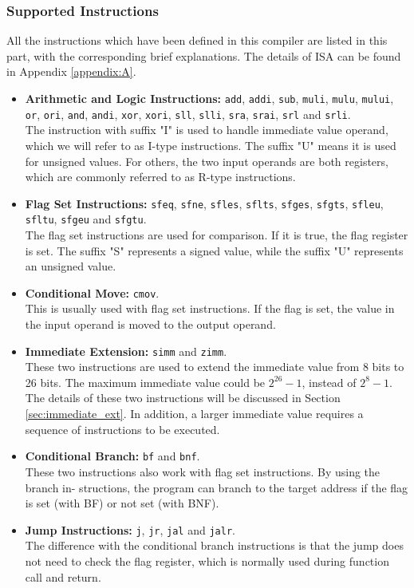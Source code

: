 \subsubsection{Supported Instructions}
All the instructions which have been defined in this compiler are listed in this part, with the corresponding brief explanations. The details of ISA can be found in Appendix \ref{appendix:A}.
\begin{itemize}
	\item \textbf{Arithmetic and Logic Instructions:} \texttt{add}, \texttt{addi}, \texttt{sub}, \texttt{muli}, \texttt{mulu}, \texttt{mului}, \texttt{or}, \texttt{ori}, \texttt{and}, \texttt{andi}, \texttt{xor}, \texttt{xori}, \texttt{sll}, \texttt{slli}, \texttt{sra}, \texttt{srai}, \texttt{srl} and \texttt{srli}.\\
The instruction with suffix "I" is used to handle immediate value operand, which we will refer to as I-type instructions. The suffix "U" means it is used for unsigned values. For others, the two input operands are both registers, which are commonly referred to as R-type instructions.
	\item \textbf{Flag Set Instructions:} \texttt{sfeq}, \texttt{sfne}, \texttt{sfles}, \texttt{sflts}, \texttt{sfges}, \texttt{sfgts}, \texttt{sfleu}, \texttt{sfltu}, \texttt{sfgeu} and \texttt{sfgtu}.\\
The flag set instructions are used for comparison. If it is true, the flag register is set. The suffix "S" represents a signed value, while the suffix "U" represents an unsigned value.
	\item \textbf{Conditional Move:} \texttt{cmov}.\\ This is usually used with flag set instructions. If the flag is set, the value in the input operand is moved to the output operand.
	\item \textbf{Immediate Extension:} \texttt{simm} and \texttt{zimm}.\\ These two instructions are used to extend the immediate value from 8 bits to 26 bits. The maximum immediate value could be $2^{26}-1$, instead of $2^8-1$. The details of these two instructions will be discussed in Section \ref{sec:immediate_ext}. In addition, a larger immediate value requires a sequence of instructions to be executed.
	\item \textbf{Conditional Branch:} \texttt{bf} and \texttt{bnf}.\\ These two instructions also work with flag set instructions. By using the branch in- structions, the program can branch to the target address if the flag is set (with BF) or not set (with BNF).
	\item \textbf{Jump Instructions:} \texttt{j}, \texttt{jr}, \texttt{jal} and \texttt{jalr}.\\ The difference with the conditional branch instructions is that the jump does not need to check the flag register, which is normally used during function call and return.
\end{itemize}

